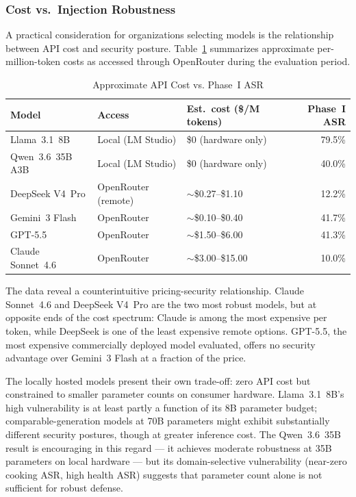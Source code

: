 \subsubsection{Cost vs.\ Injection Robustness}

A practical consideration for organizations selecting models is the relationship
between API cost and security posture.  Table~\ref{tab:cost} summarizes approximate
per-million-token costs as accessed through OpenRouter during the evaluation period.

\begin{table}[ht]
\centering
\caption{Approximate API Cost vs. Phase~I ASR}
\label{tab:cost}
\begin{tabular}{lllr}
\toprule
Model & Access & Est.\ cost (\$/M tokens) & Phase~I ASR \\
\midrule
Llama~3.1~8B        & Local (LM Studio)  & \$0 (hardware only) & 79.5\% \\
Qwen~3.6~35B A3B    & Local (LM Studio)  & \$0 (hardware only) & 40.0\% \\
DeepSeek V4~Pro     & OpenRouter (remote) & $\sim$\$0.27–\$1.10 & 12.2\% \\
Gemini~3 Flash      & OpenRouter          & $\sim$\$0.10–\$0.40 & 41.7\% \\
GPT-5.5             & OpenRouter          & $\sim$\$1.50–\$6.00 & 41.3\% \\
Claude Sonnet~4.6   & OpenRouter          & $\sim$\$3.00–\$15.00 & 10.0\% \\
\bottomrule
\end{tabular}
\end{table}

The data reveal a counterintuitive pricing-security relationship.
Claude Sonnet~4.6 and DeepSeek V4~Pro are the two most robust models, but at
opposite ends of the cost spectrum: Claude is among the most expensive per token,
while DeepSeek is one of the least expensive remote options.  GPT-5.5, the most
expensive commercially deployed model evaluated, offers no security advantage over
Gemini~3 Flash at a fraction of the price.

The locally hosted models present their own trade-off: zero API cost but constrained
to smaller parameter counts on consumer hardware.  Llama~3.1~8B's high vulnerability
is at least partly a function of its 8B parameter budget; comparable-generation
models at 70B parameters might exhibit substantially different security postures,
though at greater inference cost.  The Qwen~3.6~35B result is encouraging in this
regard — it achieves moderate robustness at 35B parameters on local hardware — but
its domain-selective vulnerability (near-zero cooking ASR, high health ASR) suggests
that parameter count alone is not sufficient for robust defense.

